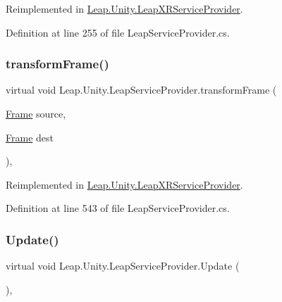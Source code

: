 Reimplemented in \mbox{\hyperlink{class_leap_1_1_unity_1_1_leap_x_r_service_provider_a0ff2b5db35ce36adb3ede2f63722a34e}{Leap.\+Unity.\+Leap\+X\+R\+Service\+Provider}}.



Definition at line 255 of file Leap\+Service\+Provider.\+cs.

\mbox{\label{class_leap_1_1_unity_1_1_leap_service_provider_a019689a8ce8bc22f6c0effa7010ec215}} 
\subsubsection{\texorpdfstring{transformFrame()}{transformFrame()}}
{\footnotesize\ttfamily virtual void Leap.\+Unity.\+Leap\+Service\+Provider.\+transform\+Frame (\begin{DoxyParamCaption}\item[{\mbox{\hyperlink{class_leap_1_1_frame}{Frame}}}]{source,  }\item[{\mbox{\hyperlink{class_leap_1_1_frame}{Frame}}}]{dest }\end{DoxyParamCaption})\hspace{0.3cm}{\ttfamily [protected]}, {\ttfamily [virtual]}}



Reimplemented in \mbox{\hyperlink{class_leap_1_1_unity_1_1_leap_x_r_service_provider_a1bac02ff68b78b4e584567c6e4bf42ac}{Leap.\+Unity.\+Leap\+X\+R\+Service\+Provider}}.



Definition at line 543 of file Leap\+Service\+Provider.\+cs.

\mbox{\label{class_leap_1_1_unity_1_1_leap_service_provider_a8823a3e4e7c2c5f1d71dbe9a9fb937f4}} 
\subsubsection{\texorpdfstring{Update()}{Update()}}
{\footnotesize\ttfamily virtual void Leap.\+Unity.\+Leap\+Service\+Provider.\+Update (\begin{DoxyParamCaption}{ }\end{DoxyParamCaption})\hspace{0.3cm}{\ttfamily [protected]}, {\ttfamily [virtual]}}



